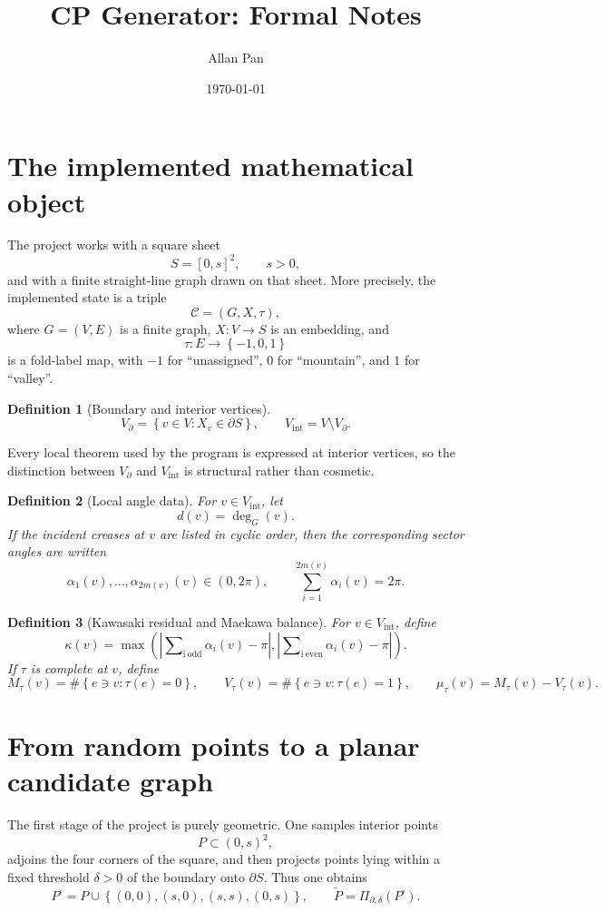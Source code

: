 \documentclass[11pt]{article}
\title{CP Generator: Formal Notes}
\author{Allan Pan}
\date{\today}
\newtheorem{definition}{Definition}[section]
\theoremstyle{remark}
\newcommand{\CP}{\mathcal{C}}
\newcommand{\abs}[1]{\left\lvert #1 \right\rvert}
\newcommand{\set}[1]{\left\{ #1 \right\}}
\newcommand{\odd}{\operatorname*{\sum\nolimits_{i\ \mathrm{odd}}}}
\newcommand{\even}{\operatorname*{\sum\nolimits_{i\ \mathrm{even}}}}
\begin{document}
\maketitle

\section{The implemented mathematical object}

The project works with a square sheet
\[
S=[0,s]^2,\qquad s>0,
\]
and with a finite straight-line graph drawn on that sheet. More precisely, the
implemented state is a triple
\[
\CP=(G,X,\tau),
\]
where $G=(V,E)$ is a finite graph, $X\colon V\to S$ is an embedding, and
\[
\tau\colon E\to\set{-1,0,1}
\]
is a fold-label map, with $-1$ for ``unassigned'', $0$ for ``mountain'', and
$1$ for ``valley''.

\begin{definition}[Boundary and interior vertices]
\[
V_{\partial}=\set{v\in V:X_v\in\partial S},
\qquad
V_{\mathrm{int}}=V\setminus V_{\partial}.
\]
\end{definition}

Every local theorem used by the program is expressed at interior vertices, so
the distinction between $V_{\partial}$ and $V_{\mathrm{int}}$ is structural
rather than cosmetic.

\begin{definition}[Local angle data]
For $v\in V_{\mathrm{int}}$, let
\[
d(v)=\deg_G(v).
\]
If the incident creases at $v$ are listed in cyclic order, then the
corresponding sector angles are written
\[
\alpha_1(v),\dots,\alpha_{2m(v)}(v)\in(0,2\pi),
\qquad
\sum_{i=1}^{2m(v)}\alpha_i(v)=2\pi.
\]
\end{definition}

\begin{definition}[Kawasaki residual and Maekawa balance]
For $v\in V_{\mathrm{int}}$, define
\[
\kappa(v)
=
\max\!\left(
\abs{\odd \alpha_i(v)-\pi},
\abs{\even \alpha_i(v)-\pi}
\right).
\]
If $\tau$ is complete at $v$, define
\[
M_\tau(v)=\#\set{e\ni v:\tau(e)=0},
\qquad
V_\tau(v)=\#\set{e\ni v:\tau(e)=1},
\qquad
\mu_\tau(v)=M_\tau(v)-V_\tau(v).
\]
\end{definition}

\section{From random points to a planar candidate graph}

The first stage of the project is purely geometric. One samples interior points
\[
P\subset (0,s)^2,
\]
adjoins the four corners of the square, and then projects points lying within a
fixed threshold $\delta>0$ of the boundary onto $\partial S$. Thus one obtains
\[
P^\square=P\cup\set{(0,0),(s,0),(s,s),(0,s)},
\qquad
\widetilde P=\Pi_{\partial,\delta}(P^\square).
\]
\end{document}
